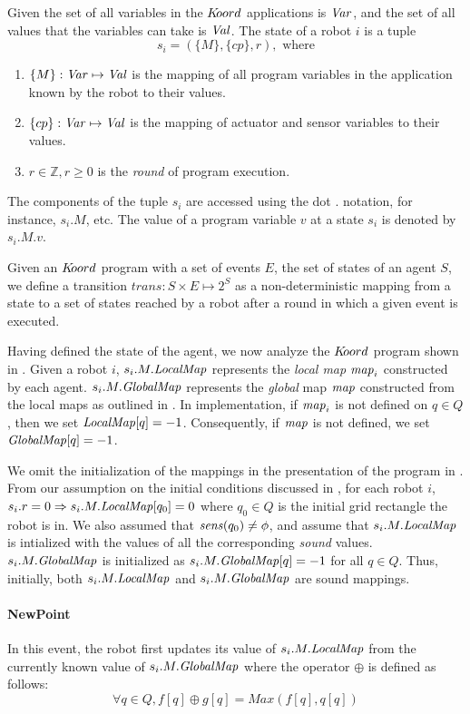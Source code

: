 \noindent
Given the set of all variables in the $K\kern-2pt oord$ applications is $\mathit{Var}$, and the set of all values that the variables can take is $\mathit{Val}$. The state of a robot $i$ is a tuple $$s_i = ( \{M\}, \{cp\}, r), \mbox{ where}$$
\begin{enumerate}
\item $\{M\} : \mathit{Var} \mapsto \mathit{Val}$ is the mapping of all program variables in the application known by the robot to their values.
\item $\{cp\} : \mathit{Var} \mapsto \mathit{Val}$ is the mapping of actuator and sensor variables to their values.
    \item $r\in \mathbb{Z},r \geq 0$ is the \emph{round} of program execution.
\end{enumerate}
The components of the tuple $s_i$ are accessed using the dot $.$ notation, for instance, $s_i.M$, etc. The value of a program variable $v$ at a state $s_i$ is denoted by $s_i.M.v$.

Given an $K\kern-2pt oord$ program with a set of events $E$, the set of states of an agent $S$, we define a transition $\mathit{trans}: S \times E \mapsto 2^S$ as a non-deterministic mapping from a state  to a set of states reached by a robot after a round in which a given event is executed.

Having defined the state of the agent, we now analyze the $K\kern-2pt oord$ program shown in . Given a robot $i$, $s_i.M.\mathit{LocalMap}$ represents the \emph{local map} $\mathit{map}_i$ constructed by each agent. $s_i.M.\mathit{GlobalMap}$ represents the \emph{global} map $\mathit{map}$ constructed from the local maps as outlined in . In implementation, if $\mathit{map}_i$ is not defined on $q\in Q$, then we set $\mathit{LocalMap}[q] = -1$. Consequently, if $\mathit{map}$ is not defined, we set $\mathit{GlobalMap}[q] = -1$.


We omit the initialization of the mappings in the presentation of the program in . From our assumption on the initial conditions discussed in , for each robot $i$, $s_i.r = 0\Rightarrow s_i.M.\mathit{LocalMap}[q_0] = 0$ where $q_0\in Q$ is the initial grid rectangle the robot is in. We also assumed that $\mathit{sens}(q_0)\neq \phi$, and assume that $s_i.M.\mathit{LocalMap}$ is intialized with the values of all the corresponding \emph{sound} values. $s_i.M.\mathit{GlobalMap}$ is initialized as $s_i.M.\mathit{GlobalMap}[q] = -1$ for all $q\in Q$. Thus, initially, both $s_i.M.\mathit{LocalMap}$ and $s_i.M.\mathit{GlobalMap}$ are sound mappings.

\paragraph{NewPoint}
In this event, the robot first updates its value of $s_i.M.\mathit{LocalMap}$ from the currently known value of $s_i.M.\mathit{GlobalMap}$ where the operator $\oplus$ is defined as follows:
 $$\forall q \in Q, f[q] \oplus g[q] = \mathit{Max}(f[q], q[q])$$

